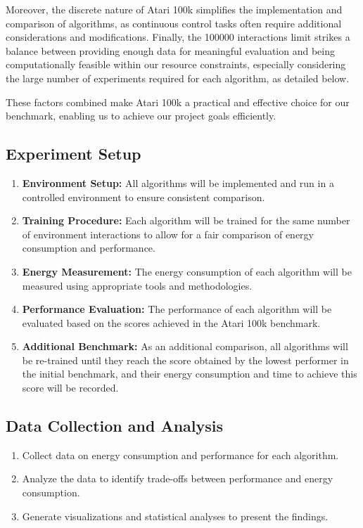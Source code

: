 Moreover, the discrete nature of Atari 100k simplifies the implementation and comparison of algorithms, as continuous control tasks often require additional considerations and modifications. Finally, the \num{100000} interactions limit strikes a balance between providing enough data for meaningful evaluation and being computationally feasible within our resource constraints, especially considering the large number of experiments required for each algorithm, as detailed below.

These factors combined make Atari 100k a practical and effective choice for our benchmark, enabling us to achieve our project goals efficiently.


\subsection{Experiment Setup}

\begin{enumerate}
	\item \textbf{Environment Setup:} All algorithms will be implemented and run in a controlled environment to ensure consistent comparison.
	\item \textbf{Training Procedure:} Each algorithm will be trained for the same number of environment interactions to allow for a fair comparison of energy consumption and performance.
	\item \textbf{Energy Measurement:} The energy consumption of each algorithm will be measured using appropriate tools and methodologies.
	\item \textbf{Performance Evaluation:} The performance of each algorithm will be evaluated based on the scores achieved in the Atari 100k benchmark.
	\item \textbf{Additional Benchmark:} As an additional comparison, all algorithms will be re-trained until they reach the score obtained by the lowest performer in the initial benchmark, and their energy consumption and time to achieve this score will be recorded.
\end{enumerate}

\subsection{Data Collection and Analysis}

\begin{enumerate}
	\item Collect data on energy consumption and performance for each algorithm.
	\item Analyze the data to identify trade-offs between performance and energy consumption.
	\item Generate visualizations and statistical analyses to present the findings.
\end{enumerate}
